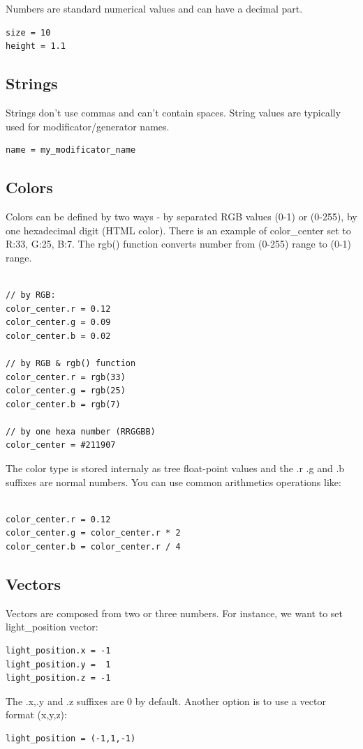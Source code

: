 \documentclass[9pt]{article}
\begin{document}
Numbers are standard numerical values and can have a decimal part.
\begin{verbatim}
size = 10
height = 1.1
\end{verbatim}

\subsection{Strings}

Strings don't use commas and can't contain spaces. String values are typically 
used for modificator/generator names.
\begin{verbatim}
name = my_modificator_name
\end{verbatim}

\subsection{Colors}
Colors can be defined by two ways - by separated RGB values (0-1) or (0-255),
by one hexadecimal digit (HTML color). There is an example
of color\_center set to R:33, G:25, B:7. The rgb() function converts
number from (0-255) range to (0-1) range.
\begin{verbatim}

// by RGB:
color_center.r = 0.12
color_center.g = 0.09
color_center.b = 0.02

// by RGB & rgb() function
color_center.r = rgb(33)
color_center.g = rgb(25)
color_center.b = rgb(7)

// by one hexa number (RRGGBB)
color_center = #211907

\end{verbatim}

The color type is stored internaly as tree float-point values and the 
.r .g and .b suffixes are normal numbers. You can use
common arithmetics operations like:

\begin{verbatim}

color_center.r = 0.12
color_center.g = color_center.r * 2
color_center.b = color_center.r / 4

\end{verbatim}

\subsection{Vectors}

Vectors are composed from two or three numbers. For instance, we want to 
set light\_position vector:
\begin{verbatim}
light_position.x = -1
light_position.y =  1
light_position.z = -1
\end{verbatim}
The .x,.y and .z suffixes are 0 by default. Another option is
to use a vector format (x,y,z):
\begin{verbatim}
light_position = (-1,1,-1)
\end{verbatim}
\end{document}
